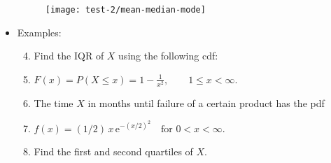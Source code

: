\documentclass{article}
\newcommand{\e}{\mathrm{e}}		%
\begin{document}
\begin{itemize}
     \begin{figure}[H]
         \center\texttt{[image: test-2/mean-median-mode]}
     \end{figure}
     \item Examples:
     \begin{enumerate}\setcounter{enumi}{3}
        \item Find the IQR of $X$ using the following cdf:
        \item[] $\displaystyle F(x) = P(X \le x) = 1 - \frac{1}{x^2}, \quad\quad 1 \le x < \infty$.\vspace{130pt}
        \item The time $X$ in months until failure of a certain product has the pdf 
        \item[] $f(x) = (1/2)\,x\,\e^{-(x/2)^2} \quad \text{for } 0 < x < \infty$.
        \item[] Find the first and second quartiles of $X$.\vspace{150pt}

     \end{enumerate}
\end{itemize}\bigskip
\end{document}
